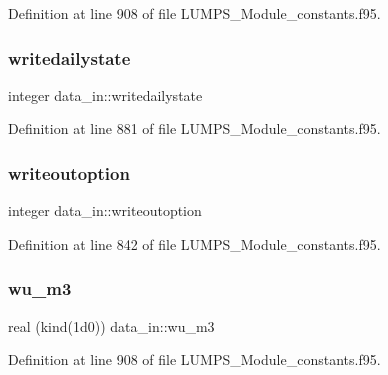 Definition at line 908 of file L\+U\+M\+P\+S\+\_\+\+Module\+\_\+constants.\+f95.

\mbox{\label{namespacedata__in_adf35232d8407e784ed41dc8f09ffe171}} 
\subsubsection{\texorpdfstring{writedailystate}{writedailystate}}
{\footnotesize\ttfamily integer data\+\_\+in\+::writedailystate}



Definition at line 881 of file L\+U\+M\+P\+S\+\_\+\+Module\+\_\+constants.\+f95.

\mbox{\label{namespacedata__in_a902aee6a424a884da4775e7a40782896}} 
\subsubsection{\texorpdfstring{writeoutoption}{writeoutoption}}
{\footnotesize\ttfamily integer data\+\_\+in\+::writeoutoption}



Definition at line 842 of file L\+U\+M\+P\+S\+\_\+\+Module\+\_\+constants.\+f95.

\mbox{\label{namespacedata__in_ae8c7901bd4995fbdec3868c38d2101b1}} 
\subsubsection{\texorpdfstring{wu\+\_\+m3}{wu\_m3}}
{\footnotesize\ttfamily real (kind(1d0)) data\+\_\+in\+::wu\+\_\+m3}



Definition at line 908 of file L\+U\+M\+P\+S\+\_\+\+Module\+\_\+constants.\+f95.

\mbox{\label{namespacedata__in_a22f13004f0c25b6603cceb88897eaee5}} 
